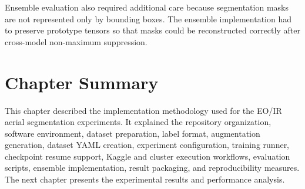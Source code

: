 Ensemble evaluation also required additional care because segmentation masks are not represented only by bounding boxes. The ensemble implementation had to preserve prototype tensors so that masks could be reconstructed correctly after cross-model non-maximum suppression.

\section{Chapter Summary}

This chapter described the implementation methodology used for the EO/IR aerial segmentation experiments. It explained the repository organization, software environment, dataset preparation, label format, augmentation generation, dataset YAML creation, experiment configuration, training runner, checkpoint resume support, Kaggle and cluster execution workflows, evaluation scripts, ensemble implementation, result packaging, and reproducibility measures. The next chapter presents the experimental results and performance analysis.

